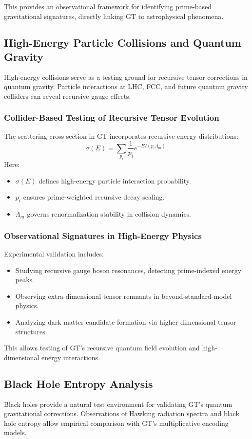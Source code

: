 \documentclass{article}
\theoremstyle{plain}
\begin{document}
This provides an observational framework for identifying prime-based gravitational signatures, directly linking GT to astrophysical phenomena.

\subsection{High-Energy Particle Collisions and Quantum Gravity}
High-energy collisions serve as a testing ground for recursive tensor corrections in quantum gravity. Particle interactions at LHC, FCC, and future quantum gravity colliders can reveal recursive gauge effects.

\subsubsection{Collider-Based Testing of Recursive Tensor Evolution}
The scattering cross-section in GT incorporates recursive energy distributions:
\begin{equation}
    \sigma(E) = \sum_{p_i} \frac{1}{p_i} e^{-E/(p_i \Lambda_m)}.
\end{equation}
Here:
\begin{itemize}
    \item $\sigma(E)$ defines high-energy particle interaction probability.
    \item $p_i$ ensures prime-weighted recursive decay scaling.
    \item $\Lambda_m$ governs renormalization stability in collision dynamics.
\end{itemize}

\subsubsection{Observational Signatures in High-Energy Physics}
Experimental validation includes:
\begin{itemize}
    \item Studying recursive gauge boson resonances, detecting prime-indexed energy peaks.
    \item Observing extra-dimensional tensor remnants in beyond-standard-model physics.
    \item Analyzing dark matter candidate formation via higher-dimensional tensor structures.
\end{itemize}

This allows testing of GT’s recursive quantum field evolution and high-dimensional energy interactions.

\subsection{Black Hole Entropy Analysis}
Black holes provide a natural test environment for validating GT’s quantum gravitational corrections. Observations of Hawking radiation spectra and black hole entropy allow empirical comparison with GT’s multiplicative encoding models.
\end{document}
